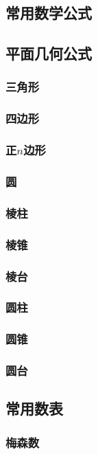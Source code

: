 \documentclass[a4paper]{article}
\begin{document}
\subsection{常用数学公式}

\subsection{平面几何公式}

\subsubsection{三角形}

\subsubsection{四边形}

\subsubsection{正$n$边形}

\subsubsection{圆}

\subsubsection{棱柱}

\subsubsection{棱锥}

\subsubsection{棱台}

\subsubsection{圆柱}

\subsubsection{圆锥}

\subsubsection{圆台}

\subsection{常用数表}

\subsubsection{梅森数}
\end{document}
